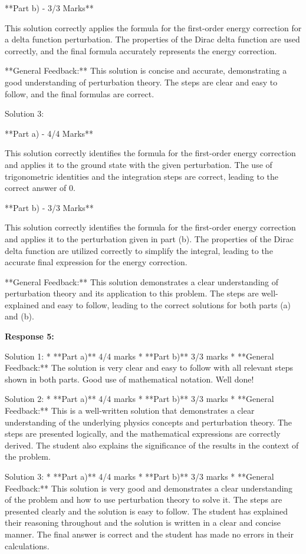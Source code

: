 \documentclass[a4paper,11pt]{article}
\begin{document}
**Part b) - 3/3 Marks**

This solution correctly applies the formula for the first-order energy correction for a delta function perturbation. The properties of the Dirac delta function are used correctly, and the final formula accurately represents the energy correction.

**General Feedback:** This solution is concise and accurate, demonstrating a good understanding of perturbation theory. The steps are clear and easy to follow, and the final formulas are correct.

Solution 3:

**Part a) - 4/4 Marks**

This solution correctly identifies the formula for the first-order energy correction and applies it to the ground state with the given perturbation. The use of trigonometric identities and the integration steps are correct, leading to the correct answer of 0.

**Part b) - 3/3 Marks**

This solution correctly identifies the formula for the first-order energy correction and applies it to the perturbation given in part (b). The properties of the Dirac delta function are utilized correctly to simplify the integral, leading to the accurate final expression for the energy correction.

**General Feedback:** This solution demonstrates a clear understanding of perturbation theory and its application to this problem. The steps are well-explained and easy to follow, leading to the correct solutions for both parts (a) and (b).

\bigskip    
\textbf{Response 5:}

Solution 1:
* **Part a)** 4/4 marks
* **Part b)** 3/3 marks
* **General Feedback:** The solution is very clear and easy to follow with all relevant steps shown in both parts. Good use of mathematical notation. Well done!

Solution 2: 
* **Part a)** 4/4 marks
* **Part b)** 3/3 marks
* **General Feedback:** This is a well-written solution that demonstrates a clear understanding of the underlying physics concepts and perturbation theory. The steps are presented logically, and the mathematical expressions are correctly derived. The student also explains the significance of the results in the context of the problem.

Solution 3:
* **Part a)** 4/4 marks
* **Part b)** 3/3 marks
* **General Feedback:** This solution is very good and demonstrates a clear understanding of the problem and how to use perturbation theory to solve it. The steps are presented clearly and the solution is easy to follow. The student has explained their reasoning throughout and the solution is written in a clear and concise manner. The final answer is correct and the student has made no errors in their calculations.
\end{document}
